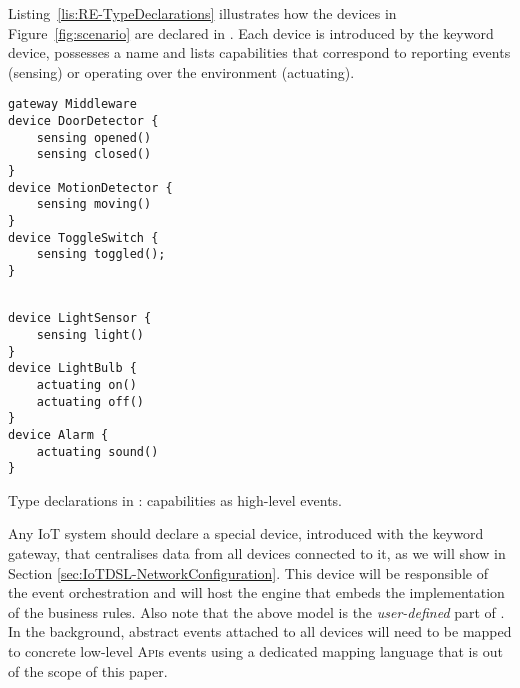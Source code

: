Listing~\ref{lis:RE-TypeDeclarations} illustrates how the devices in Figure~\ref{fig:scenario} are declared in \IOTDSL. Each device is introduced by the keyword \textsf{device}, possesses a name and lists capabilities that correspond to reporting events (\textsf{sensing}) or operating over the environment (\textsf{actuating}). 

\begin{table}
	\begin{minipage}[b]{.45\textwidth }%
		\begin{lstlisting}[language=iotdsl]	
gateway Middleware
device DoorDetector {
	sensing opened()
	sensing closed()
}
device MotionDetector {
	sensing moving()
}
device ToggleSwitch {
	sensing toggled();
}
		\end{lstlisting}
	\end{minipage}\hfill%
	\begin{minipage}[b]{.45\textwidth}
		\begin{lstlisting}[language=iotdsl, firstnumber=12]
		
device LightSensor {
	sensing light()
}
device LightBulb {
	actuating on()
	actuating off()
}	
device Alarm {
	actuating sound()
}
		\end{lstlisting}
	\end{minipage}
	\caption{Type declarations in \IOTDSL: capabilities as high-level events.}
	\label{lis:RE-TypeDeclarations}
\end{table}

Any IoT system should declare a special device, introduced with the keyword \textsf{gateway}, that centralises data from all devices connected to it, as we will show in Section \ref{sec:IoTDSL-NetworkConfiguration}. This device will be responsible of the event orchestration and will host the \CEP engine that embeds the implementation of the business rules. Also note that the above model is the \textit{user-defined} part of \IOTDSL. In the background, abstract events attached to all devices will need to be mapped to concrete low-level \textsc{Api}s events using a dedicated mapping language that is out of the scope of this paper.

